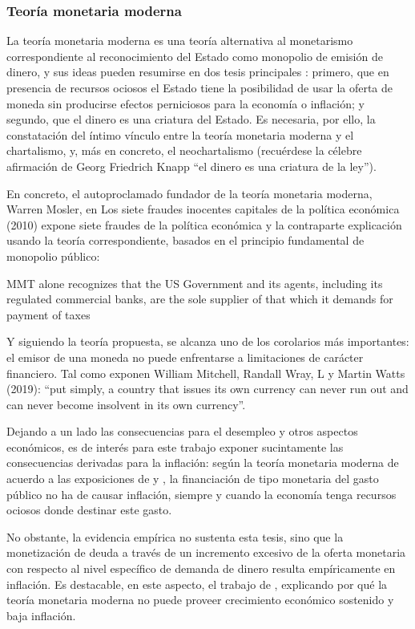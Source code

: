 \documentclass[titlepage, 12pt]{article}
\begin{document}
\subsubsection{Teoría monetaria moderna}
La teoría monetaria moderna es una teoría alternativa al monetarismo correspondiente al reconocimiento del Estado como monopolio de emisión de dinero, y sus ideas pueden resumirse en dos tesis principales \autocite{rallo2015}: primero, que en presencia de recursos ociosos el Estado tiene la posibilidad de usar la oferta de moneda sin producirse efectos perniciosos para la economía o inflación; y segundo, que el dinero es una criatura del Estado. Es necesaria, por ello, la constatación del íntimo vínculo entre la teoría monetaria moderna y el chartalismo, y, más en concreto, el neochartalismo (recuérdese la célebre afirmación de Georg Friedrich Knapp \enquote{el dinero es una criatura de la ley}).

En concreto, el autoproclamado fundador de la teoría monetaria moderna, Warren Mosler, en Los siete fraudes inocentes capitales de la política económica (2010) expone siete fraudes de la política económica y la contraparte explicación usando la teoría correspondiente, basados en el principio fundamental de monopolio público:

\begin{displayquote}
    MMT alone recognizes that the US Government and its agents, including its regulated commercial banks, are the sole supplier of that which it demands for payment of taxes \autocite{mosler2020}
\end{displayquote}

Y siguiendo la teoría propuesta, se alcanza uno de los corolarios más importantes: el emisor de una moneda no puede enfrentarse a limitaciones de carácter financiero. Tal como exponen William Mitchell, Randall Wray, L y Martin Watts (2019): \enquote{put simply, a country that issues its own currency can never run out and can never become insolvent in its own currency}.

Dejando a un lado las consecuencias para el desempleo y otros aspectos económicos, es de interés para este trabajo exponer sucintamente las consecuencias derivadas para la inflación: según la teoría monetaria moderna de acuerdo a las exposiciones de \cite{mitchell2019} y \cite{kelton2020}, la financiación de tipo monetaria del gasto público no ha de causar inflación, siempre y cuando la economía tenga recursos ociosos donde destinar este gasto.

No obstante, la evidencia empírica no sustenta esta tesis, sino que la monetización de deuda a través de un incremento excesivo de la oferta monetaria con respecto al nivel específico de demanda de dinero resulta empíricamente en inflación. Es destacable, en este aspecto, el trabajo de \cite{castaneda2021}, explicando por qué la teoría monetaria moderna no puede proveer crecimiento económico sostenido y baja inflación.
\end{document}
